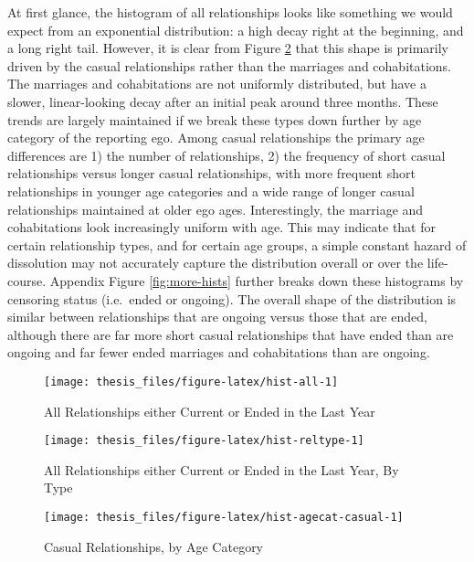 \documentclass [11pt, proquest] {uwthesis}[2015/03/03]
\begin{document}
At first glance, the histogram of all relationships looks like something we would expect from an exponential distribution: a high decay right at the beginning, and a long right tail. However, it is clear from Figure \ref{fig:hist-reltype} that this shape is primarily driven by the casual relationships rather than the marriages and cohabitations. The marriages and cohabitations are not uniformly distributed, but have a slower, linear-looking decay after an initial peak around three months. These trends are largely maintained if we break these types down further by age category of the reporting ego. Among casual relationships the primary age differences are 1) the number of relationships, 2) the frequency of short casual relationships versus longer casual relationships, with more frequent short relationships in younger age categories and a wide range of longer casual relationships maintained at older ego ages. Interestingly, the marriage and cohabitations look increasingly uniform with age. This may indicate that for certain relationship types, and for certain age groups, a simple constant hazard of dissolution may not accurately capture the distribution overall or over the life-course. Appendix Figure \ref{fig:more-hists} further breaks down these histograms by censoring status (i.e.~ended or ongoing). The overall shape of the distribution is similar between relationships that are ongoing versus those that are ended, although there are far more short casual relationships that have ended than are ongoing and far fewer ended marriages and cohabitations than are ongoing.
\begin{figure}

{\centering \texttt{[image: thesis\_files/figure-latex/hist-all-1]} 

}

\caption{All Relationships either Current or Ended in the Last Year}\label{fig:hist-all}
\end{figure}
\begin{figure}

{\centering \texttt{[image: thesis\_files/figure-latex/hist-reltype-1]} 

}

\caption{All Relationships either Current or Ended in the Last Year, By Type}\label{fig:hist-reltype}
\end{figure}
\begin{figure}

{\centering \texttt{[image: thesis\_files/figure-latex/hist-agecat-casual-1]} 

}

\caption{Casual Relationships, by Age Category}\label{fig:hist-agecat-casual}
\end{figure}
\end{document}
